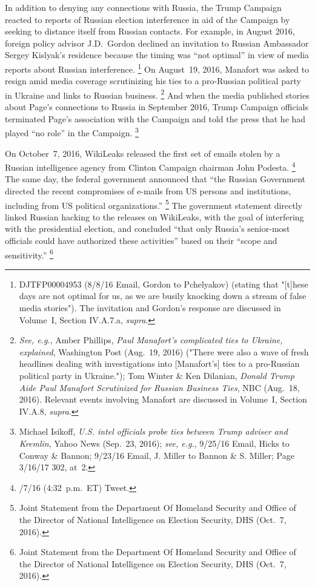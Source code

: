 In addition to denying any connections with Russia, the Trump Campaign reacted to reports of Russian election interference in aid of the Campaign by seeking to distance itself from Russian contacts.
For example, in August 2016, foreign policy advisor J.D.~Gordon declined an invitation to Russian Ambassador Sergey Kislyak's residence because the timing was ``not optimal'' in view of media reports about Russian interference.%
\footnote{DJTFP00004953 (8/8/16 Email, Gordon to Pchelyakov) (stating that "[t]hese days are not optimal for us, as we are busily knocking down a stream of false media stories").
The invitation and Gordon's response are discussed in Volume~I, Section IV.A.7.a, \textit{supra}.}
On August~19, 2016, Manafort was asked to resign amid media coverage scrutinizing his ties to a pro-Russian political party in Ukraine and links to Russian business.%
\footnote{\textit{See, e.g.}, Amber Phillips, \textit{Paul Manafort's complicated ties to Ukraine, explained}, Washington Post (Aug.~19, 2016) ("There were also a wave of fresh headlines dealing with investigations into [Manafort's] ties to a pro-Russian political party in Ukraine.");
Tom Winter \& Ken Dilanian, \textit{Donald Trump Aide Paul Manafort Scrutinized for Russian Business Ties}, NBC (Aug.~18, 2016).
Relevant events involving Manafort are discussed in Volume~I, Section IV.A.8, \textit{supra}.}
And when the media published stories about Page's connections to Russia in September 2016, Trump Campaign officials terminated Page's association with the Campaign and told the press that he had played ``no role'' in the Campaign.%
\footnote{Michael Isikoff, \textit{U.S. intel officials probe ties between Trump adviser and Kremlin}, Yahoo News (Sep.~23, 2016);
\textit{see, e.g.}, 9/25/16 Email, Hicks to Conway \& Bannon;
9/23/16 Email, J. Miller to Bannon \& S. Miller;
Page 3/16/17 302, at~2.}

On October~7, 2016, WikiLeaks released the first set of emails stolen by a Russian intelligence agency from Clinton Campaign chairman John Podesta.%
\footnote{/7/16 (4:32~p.m.~ET) Tweet.}
The same day, the federal government announced that ``the Russian Government directed the recent compromises of e-mails from US persons and institutions, including from US political organizations.''%
\footnote{Joint Statement from the Department Of Homeland Security and Office of the Director of National Intelligence on Election Security, DHS (Oct.~7, 2016).}
The government statement directly linked Russian hacking to the releases on WikiLeaks, with the goal of interfering with the presidential election, and concluded ``that only Russia's senior-most officials could have authorized these activities'' based on their ``scope and sensitivity.''%
\footnote{Joint Statement from the Department Of Homeland Security and Office of the Director of National Intelligence on Election Security, DHS (Oct.~7, 2016).}

